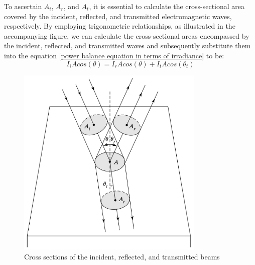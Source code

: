 To ascertain $A_i$, $A_r$, and $A_t$, it is essential to calculate the cross-sectional area covered by the incident, reflected, and transmitted electromagnetic waves, respectively. By employing trigonometric relationships, as illustrated in the accompanying figure, we can calculate the cross-sectional areas encompassed by the incident, reflected, and transmitted waves and subsequently substitute them into the equation \ref{power balance equation in terms of irradiance} to be:
\begin{equation} \label{power balance equations after CSA substitution}
I_iAcos(\theta) = I_rAcos(\theta) + I_tAcos(\theta_t)
\end{equation}

\begin{figure}
  \centering
  \includegraphics[width=0.8\textwidth]{Chapters/Figures/CSA Example for the Incident, Reflected, and Transmitted Electromagnetic Waves.jpg}
  \caption{Cross sections of the incident, reflected, and transmitted beams}
\end{figure}

